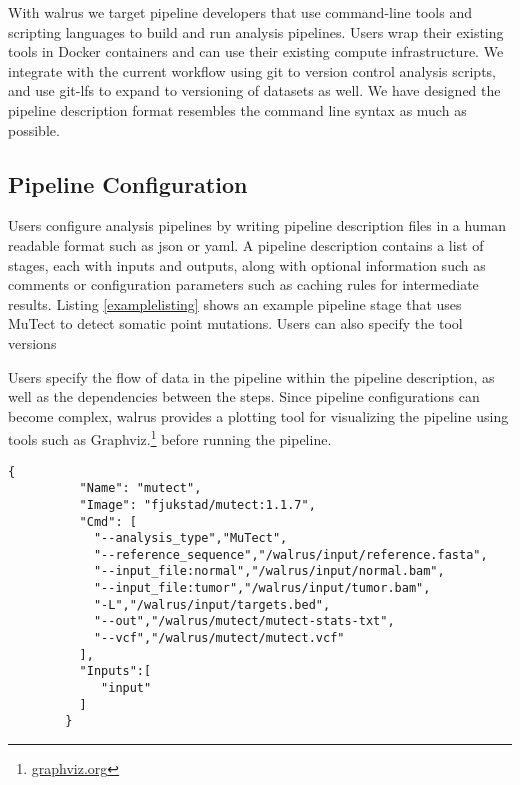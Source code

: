 With walrus we target pipeline developers that use command-line tools and
scripting languages to build and run analysis pipelines. Users wrap their
existing tools in Docker containers and can use their existing compute
infrastructure.  We integrate with the current workflow using git to version
control analysis scripts, and use git-lfs to expand to versioning of datasets as
well. We have designed the pipeline description format resembles the command
line syntax as much as possible. 



\subsection{Pipeline Configuration}
Users configure analysis pipelines by writing pipeline description files in a
human readable format such as \gls{json} or \gls{yaml}. A pipeline description
contains a list of stages, each with inputs and outputs, along with optional
information such as comments or configuration parameters such as caching rules
for intermediate results. Listing \ref{examplelisting} shows an example pipeline
stage that uses MuTect\cite{mutect} to detect somatic point mutations. Users
can also specify the tool versions 

Users specify the flow of data in the pipeline within the pipeline description,
as well as the dependencies between the steps. Since pipeline configurations can
become complex, walrus provides a plotting tool for visualizing the pipeline
using tools such as Graphviz.\footnote{\url{graphviz.org}} before running the
pipeline. 


\begin{lstlisting}[caption={Example pipeline stage for a tool that detects
somatic point mutations. It reads a reference sequence file together with both
tumor and normal sequences, and produces an output file with the detected
mutations.},
label={examplelisting}, 
basicstyle=\ttfamily\scriptsize]
        {
          "Name": "mutect",
          "Image": "fjukstad/mutect:1.1.7",
          "Cmd": [
            "--analysis_type","MuTect",
            "--reference_sequence","/walrus/input/reference.fasta",
            "--input_file:normal","/walrus/input/normal.bam",
            "--input_file:tumor","/walrus/input/tumor.bam",
            "-L","/walrus/input/targets.bed",
            "--out","/walrus/mutect/mutect-stats-txt",
            "--vcf","/walrus/mutect/mutect.vcf"
          ],
          "Inputs":[
             "input" 
          ]
        }
\end{lstlisting}

